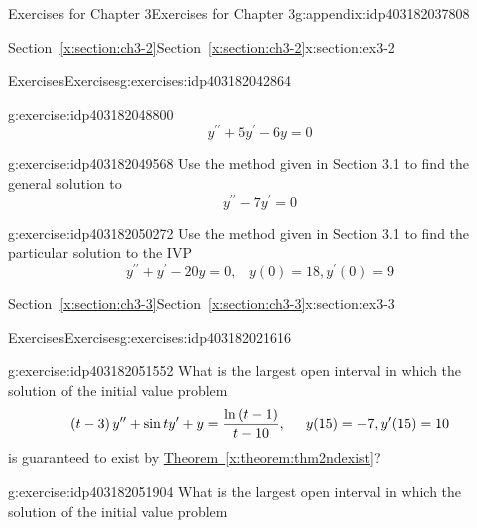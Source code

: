 \documentclass[oneside,10pt,]{book}
\newcommand{\xreffont}{\relax}
\numberwithin{equation}{section}
\numberwithin{equation}{section}
\begin{document}
\begin{appendixptx}{Exercises for Chapter 3}{}{Exercises for Chapter 3}{}{}{g:appendix:idp403182037808}
\begin{sectionptx}{Section~{\xreffont\ref*{x:section:ch3-2}}}{}{Section~{\xreffont\ref*{x:section:ch3-2}}}{}{}{x:section:ex3-2}
\begin{exercises-subsection-numberless}{Exercises}{}{Exercises}{}{}{g:exercises:idp403182042864}
\begin{divisionexercise}{3}{}{}{g:exercise:idp403182048800}
\begin{equation*}
y^{\prime\prime}+5y^{\prime}-6y=0
\end{equation*}
%
\end{divisionexercise}%
\begin{divisionexercise}{4}{}{}{g:exercise:idp403182049568}%
Use the method given in Section 3.1 to find the general solution to%
\begin{equation*}
y^{\prime\prime}-7y^{\prime}=0
\end{equation*}
%
\end{divisionexercise}%
\begin{divisionexercise}{5}{}{}{g:exercise:idp403182050272}%
Use the method given in Section 3.1 to find the particular solution to the IVP%
\begin{equation*}
y^{\prime\prime}+y^{\prime}-20y=0,\,\,\,\,\,y(0)=18,y^{\prime}(0)=9
\end{equation*}
%
\end{divisionexercise}%
\end{exercises-subsection-numberless}
\end{sectionptx}
%
%
\typeout{************************************************}
\typeout{Section D.2 Section~{\xreffont\ref*{x:section:ch3-3}}}
\typeout{************************************************}
%
\begin{sectionptx}{Section~{\xreffont\ref*{x:section:ch3-3}}}{}{Section~{\xreffont\ref*{x:section:ch3-3}}}{}{}{x:section:ex3-3}
%
%
\typeout{************************************************}
\typeout{************************************************}
%
\begin{exercises-subsection-numberless}{Exercises}{}{Exercises}{}{}{g:exercises:idp403182021616}
\begin{divisionexercise}{1}{}{}{g:exercise:idp403182051552}%
What is the largest open interval in which the solution of the initial value problem%
\begin{equation*}
\left(t-3\right)y^{\prime\prime}+\sin ty^{\prime}+y=\frac{\ln\left(t-1\right)}{t-10}, \hspace{.2in}
y(15)=-7,y^{\prime}(15)=10
\end{equation*}
is guaranteed to exist by \hyperref[x:theorem:thm2ndexist]{Theorem~{\xreffont\ref{x:theorem:thm2ndexist}}}?%
\end{divisionexercise}%
\begin{divisionexercise}{2}{}{}{g:exercise:idp403182051904}%
What is the largest open interval in which the solution of the initial value problem%
\begin{equation*}

\end{equation*}
\end{divisionexercise}
\end{exercises-subsection-numberless}
\end{sectionptx}
\end{appendixptx}
\end{document}
